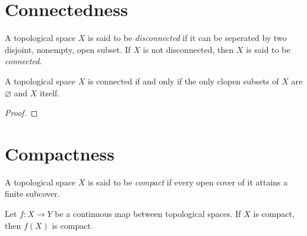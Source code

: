 \section{Connectedness}
\begin{definition}
    A topological space $X$ is said to be \textit{disconnected} if it can be seperated by two disjoint, nonempty, open subset. If $X$ is not disconnected, then $X$ is said to be \textit{connected}.
\end{definition}
\begin{proposition}
    A topological space $X$ is connected if and only if the only clopen subsets of $X$ are $\varnothing$ and $X$ itself.
\end{proposition}
\begin{proof}
    
\end{proof}
\section{Compactness}
\begin{definition}
    A topological space $X$ is said to be \textit{compact} if every open cover of it attains a finite subcover.
\end{definition}
\begin{theorem}
    Let $f: X \to Y$ be a continuous map between topological spaces. If $X$ is compact, then $f(X)$ is compact. 
\end{theorem}

